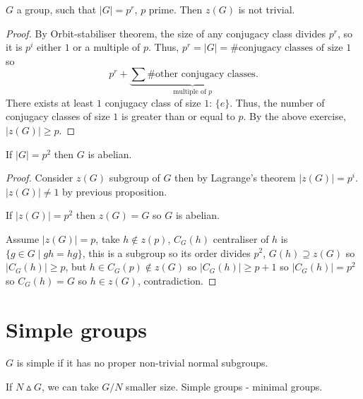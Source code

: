\documentclass[10pt, a4paper]{article}
\begin{document}
\begin{proposition}
    $G$ a group,
    such that $|G| = p ^ r$,
    $p$ prime.
    Then $z(G)$ is not trivial.

    \begin{proof}
        By Orbit-stabiliser theorem,
        the size of any conjugacy class divides $p ^ r$,
        so it is $p ^ i$ either $1$ or a multiple of $p$.
        Thus,
        $p ^ r = |G| = \#\text{conjugacy classes of size $1$}$ so
        \[
        p ^ r + \underbrace{\sum\#\text{other conjugacy classes}}_{\text{multiple of } p}.
        \]
        There exists at least $1$ conjugacy class of size $1$:
        $\{e\}$.
        Thus,
        the number of conjugacy classes of size $1$ is greater than or equal to $p$.
        By the above exercise,
        $|z(G)| \geq p$.
    \end{proof}
\end{proposition}

\begin{corollary}
    If $|G| = p ^ 2$ then $G$ is abelian.

    \begin{proof}
        Consider $z(G)$ subgroup of $G$ then by Lagrange's theorem $|z(G)| = p ^ i$.
        $|z(G)| \neq 1$ by previous proposition.

        If $|z(G)| = p ^ 2$ then $z(G) = G$ so $G$ is abelian.

        Assume $|z(G)| = p$,
        take $h \notin z(p)$,
        $C_G(h)$ centraliser of $h$ is $\{g \in G \mid gh = hg\}$,
        this is a subgroup so its order divides $p ^ 2$,
        $G(h) \supseteq z(G)$ so $|C_G(h)| \geq p$,
        but $h \in C_G(p) \notin z(G)$ so $|C_G(h)| \geq p + 1$ so $|C_G(h)| = p ^ 2$ so $C_G(h) = G$ so $h \in z(G)$,
        contradiction.
    \end{proof}
\end{corollary}

\newpage

\section{Simple groups}

\begin{definition}
    $G$ is simple if it has no proper non-trivial normal subgroups.
\end{definition}

If $N \vartriangle G$,
we can take $G / N$ smaller size.
Simple groups -
minimal groups.
\end{document}

